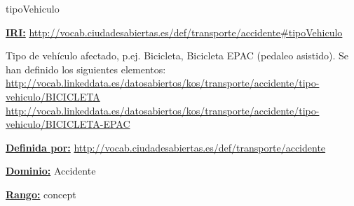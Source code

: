 \begin{mybox}{tipoVehiculo}
\begin{flushleft}
\underline{\textbf{IRI:}}
\url{http://vocab.ciudadesabiertas.es/def/transporte/accidente#tipoVehiculo}
\newline

Tipo de vehículo afectado, p.ej. Bicicleta, Bicicleta EPAC (pedaleo asistido). Se han definido los siguientes elementos:
\newline \url{http://vocab.linkeddata.es/datosabiertos/kos/transporte/accidente/tipo-vehiculo/BICICLETA}
\newline \url{http://vocab.linkeddata.es/datosabiertos/kos/transporte/accidente/tipo-vehiculo/BICICLETA-EPAC}
\newline

\underline{\textbf{Definida por:}}\newline
\url{http://vocab.ciudadesabiertas.es/def/transporte/accidente}
\newline

\underline{\textbf{Dominio:}} Accidente
\newline

\underline{\textbf{Rango:}} concept
\newline

\end{flushleft}
\end{mybox}



